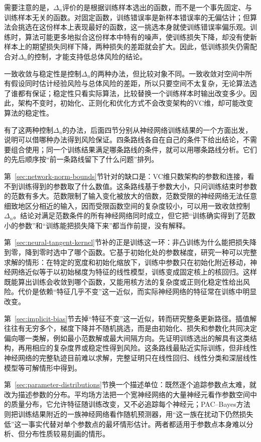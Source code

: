 需要注意的是，$\Delta_n$评价的是根据训练样本选出的函数，而不是一个事先固定、与训练样本无关的函数。对固定函数，训练错误率是新样本错误率的无偏估计；但算法会挑选在这份样本上表现最好的函数，这一挑选本身就使训练错误率偏乐观。训练时，算法可能更多地拟合这份样本中特有的噪声，使训练损失下降，却没有使新样本上的期望损失同样下降，两种损失的差距就会扩大。因此，低训练损失仍需配合对$\Delta_n$的控制，才能支持低总体风险的结论。

一致收敛与稳定性是控制$\Delta_n$的两种办法，但比较对象不同。一致收敛对空间中所有假设同时估计经验风险与总体风险的差距，所以只要空间不太复杂，无论算法选了谁都有保证；稳定性只看实际算法，比较替换一个训练样本时输出改变多少。因此，架构不变时，初始化、正则化和优化方式不会改变架构的VC维，却可能改变算法的稳定性。

有了这两种控制$\Delta_n$的办法，后面四节分别从神经网络训练结果的一个方面出发，说明可以借哪种办法得到风险保证。四条路线各自在自己的条件下给出结论，不需要组合使用；同一个训练结果满足哪条路线的条件，就可以用哪条路线分析。它们的先后顺序按“前一条路线留下了什么问题”排列。

第~\ref{sec:network-norm-bounds}节针对的缺口是：VC维只数架构的参数和连接，看不到训练得到的参数取了什么数值。这条路线基于参数大小，只问训练结束时参数的范数有多大。范数限制了输入变化被放大的倍数，范数受限的神经网络无法任意细致地区分相近的输入，因而受限函数空间的复杂度较小，可以用一致收敛控制$\Delta_n$。结论对满足范数条件的所有神经网络同时成立，但它把“训练确实得到了范数小的参数”和“训练能把损失降下来”都当作前提，没有解释。

第~\ref{sec:neural-tangent-kernel}节补的正是训练这一环：非凸训练为什么能把损失降到零，降到零时选中了哪个函数。它基于初始化处的参数梯度，研究一种可以完整求解的情形：在特定的宽度和初始化缩放下，训练中参数只在初始化附近移动，神经网络近似等于以初始梯度为特征的线性模型，训练变成固定核上的核回归。这样既能算出训练会收敛到哪个函数，又能用核方法的复杂度或正则化稳定性给出风险。代价是依赖“特征几乎不变”这一近似，而实际神经网络的特征常在训练中明显改变。

第~\ref{sec:implicit-bias}节去掉“特征不变”这一近似，转而研究整条更新路径。插值解往往有无穷多个，梯度下降并不随机挑选，而是由初始化、损失和参数化共同决定偏向哪一类解，例如最小范数解或最大间隔方向。先证明训练选出的解具有这类结构，再用相应的复杂度界或稳定性得到风险。这条路线最贴近实际训练，但非线性神经网络的完整轨迹目前难以求解，完整证明只在线性回归、线性分类和深层线性模型等可解情形中得到。

第~\ref{sec:parameter-distributions}节换一个描述单位：既然逐个追踪参数点太难，就改为描述参数的分布。平均场方法把一个宽神经网络的大量神经元看作参数空间中的质量分布，它允许特征随训练改变，又不必追踪每个神经元；PAC--Bayes方法则把训练结果附近的一族神经网络看作随机预测器，用“这一族在扰动下仍然损失低”这一事实代替对单个参数点的最坏情形估计。两者都适用于参数点本身难以分析、但分布性质较易刻画的情形。

